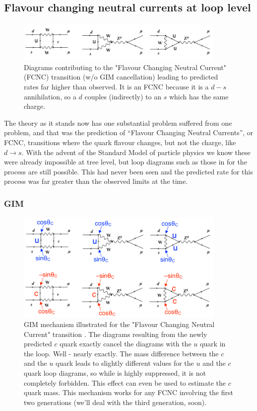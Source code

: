 \subsection{Flavour changing neutral currents at loop level}
\begin{figure}
\centering
\includegraphics[width=0.9\textwidth]{fig/0_K2mumu1}
\caption{Diagrams contributing to the "Flavour Changing Neutral Current" (FCNC) transition  (w/o GIM cancellation) leading to predicted rates far higher than observed. It is an FCNC because it is a $d-s$ annihilation, so a $d$ couples (indirectly) to an $s$ which has the same charge.
\label{fig:K2mumu1}}
\end{figure}
 The theory as it stands now has one substantial problem suffered from
 one problem, and that was the prediction of ``Flavour Changing
 Neutral Currents'', or FCNC, transitions where the quark flavour
 changes, but not the charge, like $d\to s$.  With the advent of the
 Standard Model of particle physics we know these were already
 impossible at tree level, but loop diagrams such as those in
  for the process  are
 still possible. This had never been seen and the predicted rate for
 this process was far greater than the observed limits at the time.
 

\subsubsection{GIM}
\begin{figure}
\centering
\includegraphics[width=0.9\textwidth]{fig/0_K2mumuGIM}
\caption{GIM mechanism illustrated for the "Flavour Changing Neutral Current" transition . The diagrams resulting from the newly predicted $c$ quark exactly cancel the diagrams with the $u$ quark in the loop. Well - nearly exactly. The mass difference between the $c$ and the $u$ quark leads to slightly different values for the $u$ and the $c$ quark loop diagrams, so while  is highly suppressed, it is not completely forbidden. This effect can even be used to estimate the $c$ quark mass. This mechanism works for any FCNC involving the first two generations (we'll deal with the third generation, soon).
\label{fig:K2mumuGIM}}
\end{figure}

